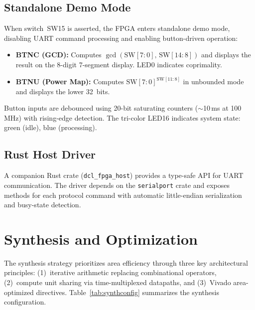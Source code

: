 \documentclass[lettersize,journal]{IEEEtran}
\begin{document}
\subsection{Standalone Demo Mode}

When switch~SW15 is asserted, the FPGA enters standalone demo mode, disabling UART command processing and enabling button-driven operation:

\begin{itemize}
\item \textbf{BTNC (GCD):} Computes $\gcd(\text{SW}[7{:}0],\, \text{SW}[14{:}8])$ and displays the result on the 8-digit 7-segment display. LED0 indicates coprimality.
\item \textbf{BTNU (Power Map):} Computes $\text{SW}[7{:}0]^{\text{SW}[11{:}8]}$ in unbounded mode and displays the lower 32~bits.
\end{itemize}

Button inputs are debounced using 20-bit saturating counters ($\sim$10\,ms at 100\,MHz) with rising-edge detection. The tri-color LED16 indicates system state: green (idle), blue (processing).

\subsection{Rust Host Driver}

A companion Rust crate (\texttt{dcl\_fpga\_host}) provides a type-safe API for UART communication. The driver depends on the \texttt{serialport} crate and exposes methods for each protocol command with automatic little-endian serialization and busy-state detection.

\section{Synthesis and Optimization}
\label{sec:synth}

The synthesis strategy prioritizes area efficiency through three key architectural principles: (1)~iterative arithmetic replacing combinational operators, (2)~compute unit sharing via time-multiplexed datapaths, and (3)~Vivado area-optimized directives. Table~\ref{tab:synthconfig} summarizes the synthesis configuration.
\end{document}

